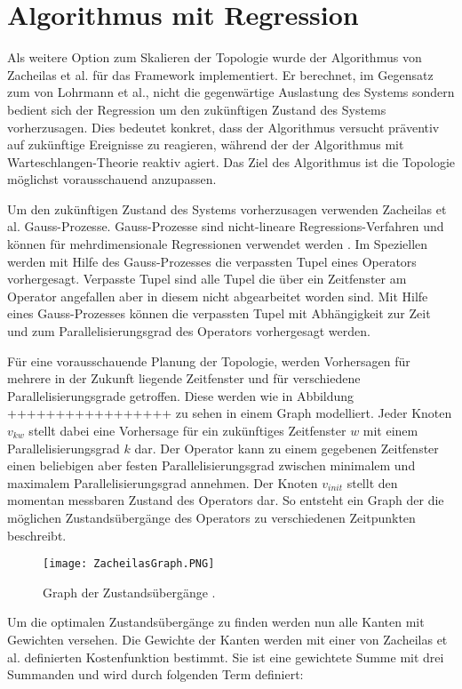 \chapter{Algorithmus mit Regression}

Als weitere Option zum Skalieren der Topologie wurde der Algorithmus von Zacheilas et al. \cite{zacheilas_elastic_2015} für das Framework implementiert.
Er berechnet, im Gegensatz zum von Lohrmann et al., nicht die gegenwärtige Auslastung des Systems sondern bedient sich der Regression um den zukünftigen Zustand des Systems vorherzusagen.
Dies bedeutet konkret, dass der Algorithmus versucht präventiv auf zukünftige Ereignisse zu reagieren, während der der Algorithmus mit Warteschlangen-Theorie reaktiv agiert.
Das Ziel des Algorithmus ist die Topologie möglichst vorausschauend anzupassen.

Um den zukünftigen Zustand des Systems vorherzusagen verwenden Zacheilas et al. Gauss-Prozesse.
Gauss-Prozesse sind nicht-lineare Regressions-Verfahren und können für mehrdimensionale Regressionen verwendet werden \cite{rasmussen2004gaussian}.
Im Speziellen werden mit Hilfe des Gauss-Prozesses die verpassten Tupel eines Operators vorhergesagt.
Verpasste Tupel sind alle Tupel die über ein Zeitfenster am Operator angefallen aber in diesem nicht abgearbeitet worden sind.
Mit Hilfe eines Gauss-Prozesses können die verpassten Tupel mit Abhängigkeit zur Zeit und zum Parallelisierungsgrad des Operators vorhergesagt werden.

Für eine vorausschauende Planung der Topologie, werden Vorhersagen für mehrere in der Zukunft liegende Zeitfenster und für verschiedene Parallelisierungsgrade getroffen.
Diese werden wie in Abbildung +++++++++++++++++ zu sehen in einem Graph modelliert.
Jeder Knoten \(v_{kw}\) stellt dabei eine Vorhersage für ein zukünftiges Zeitfenster \(w\) mit einem Parallelisierungsgrad \(k\) dar.
Der Operator kann zu einem gegebenen Zeitfenster einen beliebigen aber festen Parallelisierungsgrad zwischen minimalem und maximalem Parallelisierungsgrad annehmen.
Der Knoten \(v_{init}\) stellt den momentan messbaren Zustand des Operators dar.
So entsteht ein Graph der die möglichen Zustandsübergänge des Operators zu verschiedenen Zeitpunkten beschreibt.

\begin{figure}
\texttt{[image: ZacheilasGraph.PNG]}
\caption{Graph der Zustandsübergänge \cite{zacheilas_elastic_2015}.}
\end{figure}

Um die optimalen Zustandsübergänge zu finden werden nun alle Kanten mit Gewichten versehen.
Die Gewichte der Kanten werden mit einer von Zacheilas et al. definierten Kostenfunktion bestimmt. Sie ist eine gewichtete Summe mit drei Summanden und wird durch folgenden Term definiert\cite{zacheilas_elastic_2015}:

